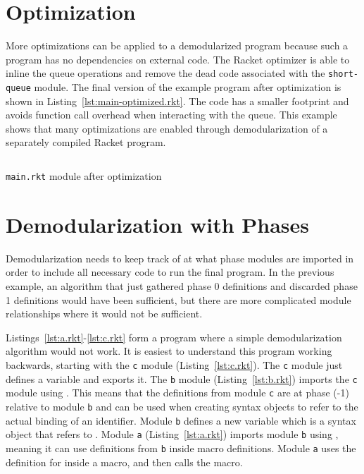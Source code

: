 \section{Optimization}

More optimizations can be applied to a demodularized program because such a program has no dependencies on external code.
The Racket optimizer is able to inline the queue operations and remove the dead code associated with the \texttt{short-queue} module. 
The final version of the example program after optimization is shown in Listing~\ref{lst:main-optimized.rkt}. 
The code has a smaller footprint and avoids function call overhead when interacting with the queue.
This example shows that many optimizations are enabled through demodularization of a separately compiled Racket program.

\begin{listing}[tb]
  \inputminted{racket}{listings/main-optimized.rkt}
  \caption{\texttt{main.rkt} module after optimization}
  \label{lst:main-optimized.rkt}
\end{listing}

\section{Demodularization with Phases}

Demodularization needs to keep track of at what phase modules are imported in order to include all necessary code to run the final program.
In the previous example, an algorithm that just gathered phase 0 definitions and discarded phase 1 definitions would have been sufficient, but there are more complicated module relationships where it would not be sufficient.

Listings~\ref{lst:a.rkt}-\ref{lst:c.rkt} form a program where a simple demodularization algorithm would not work.
It is easiest to understand this program working backwards, starting with the \texttt{c} module (Listing~\ref{lst:c.rkt}).
The \texttt{c} module just defines a variable  and exports it.
The \texttt{b} module (Listing~\ref{lst:b.rkt}) imports the \texttt{c} module using .
This means that the definitions from module \texttt{c} are at phase (-1) relative to module \texttt{b} and can be used when creating syntax objects to refer to the actual binding of an identifier.
Module \texttt{b} defines a new variable  which is a syntax object that refers to .
Module \texttt{a} (Listing~\ref{lst:a.rkt}) imports module \texttt{b} using , meaning it can use definitions from \texttt{b} inside macro definitions.
Module \texttt{a} uses the definition for  inside a macro, and then calls the macro.

